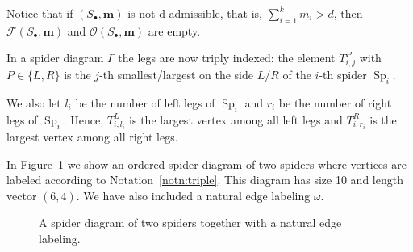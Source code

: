 \documentclass[ALCO,ThmDefs,Unicode,epreuves]{cedram}
\newcommand{\bm}[1]{{\boldsymbol{#1}}}
\newcommand\m{\bm{m}}
\DeclareMathOperator{\Sp}{Sp}
\newcommand{\D}{{\Gamma}}
\newcommand{\spd}{\mathcal F}
\newcommand{\lspd}{\mathcal O}
\begin{document}
\begin{rema}
	Notice that if $(S_\bullet,\m)$ is not d-admissible, that is, $\sum_{i=1}^k{m_i}> d$, then $\spd(S_\bullet,\m)$ and $\lspd(S_\bullet,\m)$ are empty.
\end{rema}

\begin{nota}\label{notn:triple}
	In a spider diagram $\D$ the legs are now triply indexed: the element $T^P_{i,j}$ with $P\in\{L,R\}$ is the $j$-th smallest/largest on the side $L/R$ of the $i$-th spider $\Sp_i$.
	
	We also let $l_i$ be the number of left legs of $\Sp_i$ and $r_i$ be the number of right legs of $\Sp_i.$ Hence, $T^L_{i, l_i}$ is the largest vertex among all left legs and $T^R_{i, r_i}$ is the largest vertex among all right legs.
	
\end{nota}
\begin{exam}
	In Figure~\ref{fig:spiderex} we show an ordered spider diagram of two spiders where vertices are labeled according to Notation~\ref{notn:triple}. This diagram has size 10 and length vector $(6,4)$. We have also included a natural edge labeling $\omega.$

	\begin{figure}[ht]\label{ex:spiderdiagram}
		
		
		\caption{A spider diagram of two spiders together with a natural edge labeling.}
		
		\label{fig:spiderex}
	\end{figure}

\end{exam}
\end{document}
